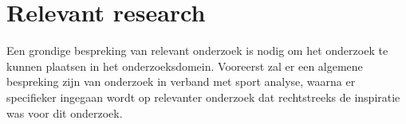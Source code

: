 \section{Relevant research}
\label{chapter:relevantResearch}
Een grondige bespreking van relevant onderzoek is nodig om het onderzoek te kunnen plaatsen in het onderzoeksdomein.
Vooreerst zal er een algemene bespreking zijn van onderzoek in verband met sport analyse, waarna er specifieker ingegaan wordt op relevanter onderzoek dat rechtstreeks de inspiratie was voor dit onderzoek.



